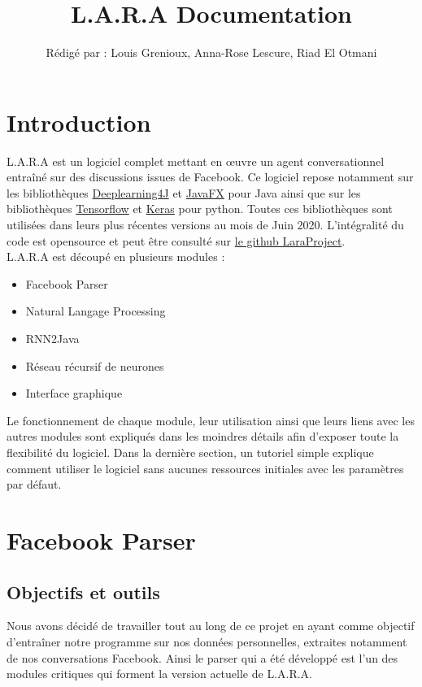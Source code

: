 \documentclass[10pt,a4paper]{article}
\title{L.A.R.A Documentation}
\author{Rédigé par : Louis Grenioux, Anna-Rose Lescure, Riad El Otmani}
\newcommand\tab[1][0.5cm]{\hspace*{#1}}
\begin{document}
\maketitle
\tableofcontents

\newpage

\section{Introduction}
L.A.R.A est un logiciel complet mettant en œuvre un agent conversationnel entraîné sur des discussions issues de Facebook. Ce logiciel repose notamment sur les bibliothèques \href{https://deeplearning4j.org/}{Deeplearning4J} et \href{https://openjfx.io/}{JavaFX} pour Java ainsi que sur les bibliothèques \href{https://www.tensorflow.org/}{Tensorflow} et \href{https://keras.io/}{Keras} pour python. Toutes ces bibliothèques sont utilisées dans leurs plus récentes versions au mois de Juin 2020. L'intégralité du code est opensource et peut être consulté sur \href{https://github.com/LaraProject}{le github LaraProject}. \\
\tab L.A.R.A est découpé en plusieurs modules :
\begin{itemize}
\item Facebook Parser
\item Natural Langage Processing
\item RNN2Java
\item Réseau récursif de neurones
\item Interface graphique
\end{itemize}
Le fonctionnement de chaque module, leur utilisation ainsi que leurs liens avec les autres modules sont expliqués dans les moindres détails afin d'exposer toute la flexibilité du logiciel. Dans la dernière section, un tutoriel simple explique comment utiliser le logiciel sans aucunes ressources initiales avec les paramètres par défaut.
 
\section{Facebook Parser}
\subsection{Objectifs et outils}
Nous avons décidé de travailler tout au long de ce projet en ayant comme objectif d'entraîner notre programme sur nos données personnelles, extraites notamment de nos conversations Facebook. Ainsi le parser qui a été développé est l'un des modules critiques qui forment la version actuelle de L.A.R.A.
\end{document}
